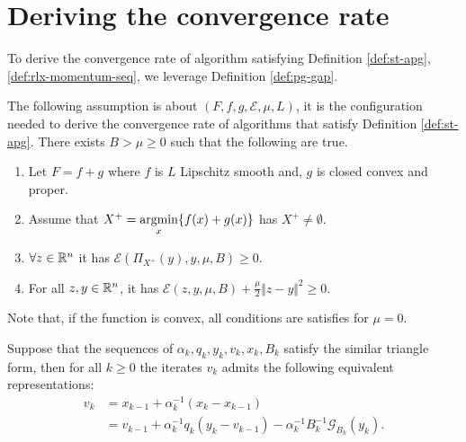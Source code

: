 \documentclass[12pt]{article}
\begin{document}
\section{Deriving the convergence rate}
    To derive the convergence rate of algorithm satisfying Definition \ref{def:st-apg}, \ref{def:rlx-momentum-seq}, we leverage Definition \ref{def:pg-gap}. 
    \begin{assumption}\label{ass:for-cnvg}
        The following assumption is about $(F, f, g, \mathcal E, \mu, L)$, it is the configuration needed to derive the convergence rate of algorithms that satisfy Definition \ref{def:st-apg}. 
        There exists $B > \mu \ge 0$ such that the following are true. 
        \begin{enumerate}[nosep]
            \item Let $F = f + g$ where $f$ is $L$ Lipschitz smooth and, $g$ is closed convex and proper.
            \item Assume that $X^+ = \mathop{\rm argmin}\limits_{x} \{f(x) + g(x)\}$ has $X^+ \neq \emptyset$.
            \item $\forall z \in \mathbb R^n$ it has $\mathcal E(\Pi_{X^+}(y), y, \mu, B) \ge 0$. 
            \item For all $z, y \in \mathbb R^n$, it has $\mathcal E(z, y, \mu, B) + \frac{\mu}{2}\Vert z - y\Vert^2 \ge 0$.   
        \end{enumerate}
        Note that, if the function is convex, all conditions are satisfies for $\mu = 0$. 
    \end{assumption}
    \begin{lemma}\label{lemma:st-iterates-alt-form-part1}
        Suppose that the sequences of $\alpha_k, q_k, y_k, v_k, x_k, B_k$ satisfy the similar triangle form, then for all $k \ge 0$ the iterates $v_k$ admits the following equivalent representations: 
        \begin{align*}
            v_k &= x_{k - 1} + \alpha_k^{-1}(x_k - x_{k - 1})
            \\
            &= v_{k - 1} + \alpha_k^{-1}q_k(y_k - v_{k - 1}) - \alpha_{k}^{-1}B_k^{-1}\mathcal G_{B_k}(y_k). 
        \end{align*}
    \end{lemma}
\end{document}
